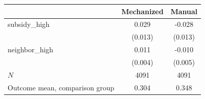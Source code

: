 \begin{tabular}{lcc}
\hline\hline
 & Mechanized & Manual \\
\hline
subsidy_high & 0.029 & -0.028 \\
 & (0.013) & (0.013) \\
neighbor_high & 0.011 & -0.010 \\
 & (0.004) & (0.005) \\
\hline
$N$ & 4091 & 4091 \\
Outcome mean, comparison group & 0.304 & 0.348 \\
\hline\hline
\end{tabular}
